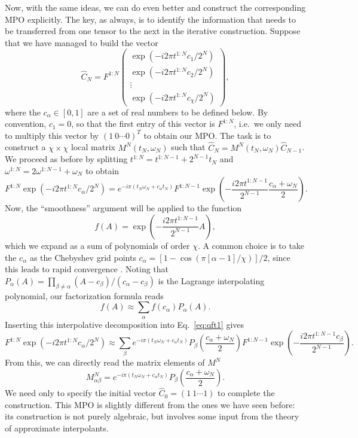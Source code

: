 \documentclass{SciPost}
\begin{document}
Now, with the same ideas, we can do even better and construct the corresponding MPO explicitly. The key, as always, is to identify the information that needs to be transferred from one tensor to the next in the iterative construction. Suppose that we have managed to build the vector
\begin{equation}
\hat C_N = F^{1:N}
\begin{pmatrix}
 \exp(-i2\pi t^{1:N} c_1/2^N) \\
 \exp(-i2\pi t^{1:N} c_2/2^N) \\
\vdots \\
 \exp(-i2\pi t^{1:N} c_\chi/2^N)
\end{pmatrix},
\end{equation}
where the $c_\alpha \in [0,1]$ are a set of real numbers to be defined below. By convention, $c_1=0$, so that the first entry of this vector is $F^{1:N}$, i.e.\ we only need to multiply this vector by $(1\ 0\cdots{}0)^T$ to obtain our MPO. The task is to construct a $\chi\times\chi$ local matrix $M^N(t_N,\omega_N)$ such that $\hat C_N = M^N(t_N,\omega_N) \hat C_{N-1}$.  We proceed as before by splitting $t^{1:N} = t^{1:N-1} + 2^{N-1} t_N$ and $\omega^{1:N} = 2 \omega^{1:N-1} + \omega_N$ to obtain
\begin{equation}
\label{eq:qft1}
F^{1:N}\exp(-i2\pi t^{1:N} c_\alpha/2^N) =
e^{-i\pi (t_N\omega_N+c_\alpha t_N)} F^{1:N-1}
\exp\left(-\frac{i2\pi t^{1:N-1}}{2^{N-1}} \frac{c_\alpha+\omega_N}{2}\right).
\end{equation}
Now, the ``smoothness'' argument will be applied to the function
\begin{equation}
f(A) = \exp\left(-\frac{i2\pi t^{1:N-1}}{2^{N-1}} A \right),
\end{equation}
which we expand as a sum of polynomials of order $\chi$. A common choice is to take the $c_\alpha$ as the Chebyshev grid points $c_\alpha=[1-\cos(\pi[\alpha-1]/\chi)]/2$, since this leads to rapid convergence \cite{trefethen2019}. Noting that $P_\alpha(A) = \prod_{\beta\ne\alpha} (A-c_\beta)/(c_\alpha -c_\beta)$ is the Lagrange interpolating polynomial, our factorization formula reads
\begin{equation}
f(A) \approx \sum_\alpha f(c_\alpha) P_\alpha(A).
\end{equation}
Inserting this interpolative decomposition into Eq.~\eqref{eq:qft1} gives
\begin{equation}
F^{1:N}\exp(-i2\pi t^{1:N} c_\alpha/2^N) \approx \sum_\beta
e^{-i\pi (t_N\omega_N+c_\alpha t_N)}
P_\beta\left(\frac{c_\alpha+\omega_N}{2}\right)
F^{1:N-1}\exp\left(-\frac{i2\pi t^{1:N-1} c_\beta}{2^{N-1}} \right).
\end{equation}
From this, we can directly read the matrix elements of $M^N$
\begin{equation}
M^N_{\alpha\beta} = e^{-i\pi (t_N\omega_N+c_\alpha t_N)}
P_\beta\left(\frac{c_\alpha+\omega_N}{2}\right).
\end{equation}
We need only to specify the initial vector $\hat C_0 = (1\ 1\cdots{}1)$ to complete the construction. This MPO is slightly different from the ones we have seen before: its construction is not purely algebraic, but involves some input from the theory of approximate interpolants.
\end{document}
